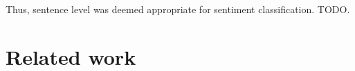 \documentclass[a4paper,11pt]{kth-mag}
\newcommand{\todo}{ ... }
\begin{document}
Thus, sentence level was deemed appropriate for sentiment classification. TODO.


%
%
%



\newpage
\section{Related work}
\end{document}
